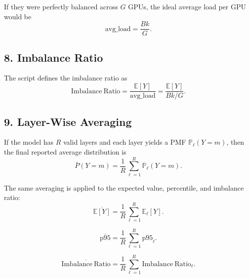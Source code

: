 If they were perfectly balanced across \(G\) GPUs, the ideal average load per GPU would be
\[
\mathrm{avg\_load}
=
\frac{Bk}{G}.
\]

\subsection*{8. Imbalance Ratio}

The script defines the imbalance ratio as
\[
\mathrm{Imbalance\ Ratio}
=
\frac{\mathbb{E}[Y]}{\mathrm{avg\_load}}
=
\frac{\mathbb{E}[Y]}{Bk/G}.
\]

\subsection*{9. Layer-Wise Averaging}

If the model has \(R\) valid layers and each layer yields a PMF
\(\mathbb{P}_{\ell}(Y=m)\), then the final reported average distribution is
\[
\bar{P}(Y=m)
=
\frac{1}{R}
\sum_{\ell=1}^{R} \mathbb{P}_{\ell}(Y=m).
\]

The same averaging is applied to the expected value, percentile, and imbalance ratio:
\[
\overline{\mathbb{E}[Y]}
=
\frac{1}{R}\sum_{\ell=1}^{R}\mathbb{E}_{\ell}[Y].
\]

\[
\overline{\mathrm{p95}}
=
\frac{1}{R}\sum_{\ell=1}^{R}\mathrm{p95}_{\ell}.
\]

\[
\overline{\mathrm{Imbalance\ Ratio}}
=
\frac{1}{R}\sum_{\ell=1}^{R}\mathrm{Imbalance\ Ratio}_{\ell}.
\]
